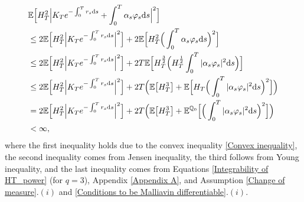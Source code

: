 \documentclass[12,reqno]{amsart}
\numberwithin{equation}{section}
\begin{document}
\begin{align}\label{E4_Proposition 4.1}
	&\mathbb{E}\Big[H_{T}^{2}\Big|K_{T}e^{-\int_{0}^{T}r_{s}\mathrm{d}s}+\int_{0}^{T}\alpha_{s}\varphi_{s}\mathrm{d}s\Big|^{2}\Big]\notag\\
	&\le2\mathbb{E}\Big[H_{T}^{2}\Big|K_{T}e^{-\int_{0}^{T}r_{s}\mathrm{d}s}\Big|^{2}\Big]+2\mathbb{E}\Big[H_{T}^{2}\Big(\int_{0}^{T}\alpha_{s}\varphi_{s}\mathrm{d}s\Big)^{2}\Big]\notag\\
	&\le2\mathbb{E}\Big[H_{T}^{2}\Big|K_{T}e^{-\int_{0}^{T}r_{s}\mathrm{d}s}\Big|^{2}\Big]+2T\mathbb{E}\Big[H_{T}^{\frac{3}{2}}\Big(H_{T}^{\frac{1}{2}}\int_{0}^{T}|\alpha_{s}\varphi_{s}|^{2}\mathrm{d}s\Big)\Big]\notag\\
	&\le2\mathbb{E}\Big[H_{T}^{2}\Big|K_{T}e^{-\int_{0}^{T}r_{s}\mathrm{d}s}\Big|^{2}\Big]+2T\Big(\mathbb{E}\big[H_{T}^{3}\big] +\mathbb{E}\Big[H_{T}\Big(\int_{0}^{T}|\alpha_{s}\varphi_{s}|^{2}\mathrm{d}s\Big)^{2}\Big]\Big)\notag\\
	&=2\mathbb{E}\Big[H_{T}^{2}\Big|K_{T}e^{-\int_{0}^{T}r_{s}\mathrm{d}s}\Big|^{2}\Big]+2T\Big(\mathbb{E}\big[H_{T}^{3}\big] +\mathbb{E}^{\mathbb{Q}_{0}}\Big[\Big(\int_{0}^{T}|\alpha_{s}\varphi_{s}|^{2}\mathrm{d}s\Big)^{2}\Big]\Big)\notag\\
	&<\infty,
\end{align}
where the first inequality holds due to the convex inequality \eqref{Convex inequality}, the second inequality comes from Jensen inequality, the third follows from Young inequality, and the last inequality comes from Equations \eqref{Integrability of HT_power} (for $q=3$), Appendix \ref{Appendix A}, and Assumption \ref{Change of measure}$.(i)$ and \ref{Conditions to be Malliavin differentiable}$.(i)$.
\end{document}
